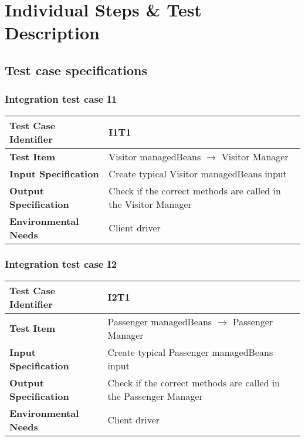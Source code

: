 \chapter{Individual Steps \& Test Description} \label{chap3}

\section{Test case specifications}


\subsection{Integration test case I1}

\begin{table}[!htbp]
\begin{center}
\begin{tabular}[t]{p{}|p{}}

\hline
\textbf{Test Case Identifier} & I1T1 \\
\hline
\textbf{Test Item} & Visitor managedBeans $\rightarrow$ Visitor Manager \\
\hline
\textbf{Input Specification} & Create typical Visitor managedBeans input  \\
\hline
\textbf{Output Specification} & Check if the correct methods are called in the Visitor Manager \\
\hline
\textbf{Environmental Needs} & Client driver \\
\hline

\end{tabular}
\end{center}
\end{table}
\clearpage

\subsection{Integration test case I2}

\begin{table}[!htbp]
\begin{center}
\begin{tabular}[t]{p{}|p{}}

\hline
\textbf{Test Case Identifier} & I2T1 \\
\hline
\textbf{Test Item} & Passenger managedBeans $\rightarrow$ Passenger Manager \\
\hline
\textbf{Input Specification} & Create typical Passenger managedBeans input  \\
\hline
\textbf{Output Specification} & Check if the correct methods are called in the Passenger Manager \\
\hline
\textbf{Environmental Needs} & Client driver \\
\hline

\end{tabular}
\end{center}
\end{table}


